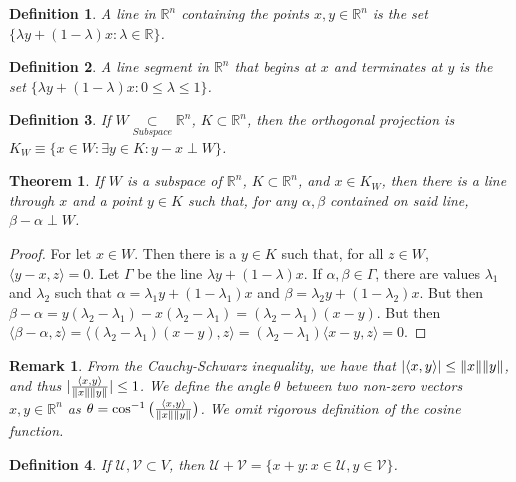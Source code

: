 \documentclass[oneside]{book}
\theoremstyle{mystyle}
\newtheorem{theorem}{Theorem}[section]
\newtheorem{definition}{Definition}[section]
\newtheorem{remark}{Remark}[section]
\DeclarePairedDelimiter\norm{\lVert}{\rVert}
\begin{document}
\begin{definition}
A line in $\mathbb{R}^n$ containing the points $x,y\in \mathbb{R}^n$ is the set $\{\lambda y + (1-\lambda)x: \lambda \in \mathbb{R}\}$.
\end{definition}

\begin{definition}
A line segment in $\mathbb{R}^n$ that begins at $x$ and terminates at $y$ is the set $\{\lambda y + (1-\lambda)x: 0\leq \lambda \leq 1 \}$.
\end{definition}

\begin{definition}
If $W\underset{Subspace}\subset\mathbb{R}^n$, $K \subset \mathbb{R}^n$, then the orthogonal projection is $K_{W}\equiv\{x\in W: \exists y\in K: y-x \perp W\}$.
\end{definition}

\begin{theorem}
If $W$ is a subspace of $\mathbb{R}^n$, $K \subset \mathbb{R}^n$, and $x\in K_{W}$, then there is a line through $x$ and a point $y\in K$ such that, for any $\alpha, \beta$ contained on said line, $\beta-\alpha \perp W$.
\end{theorem}
\begin{proof}
For let $x\in W$. Then there is a $y\in K$ such that, for all $z\in W$, $\langle y-x,z\rangle = 0$. Let $\Gamma$ be the line $\lambda y + (1-\lambda)x$. If $\alpha,\beta \in \Gamma$, there are values $\lambda_1$ and $\lambda_2$ such that $\alpha = \lambda_1 y+ (1-\lambda_1)x$ and $\beta = \lambda_2 y +(1-\lambda_2)x$. But then $\beta-\alpha = y(\lambda_2-\lambda_1)-x(\lambda_2-\lambda_1) = (\lambda_2-\lambda_1)(x-y)$. But then $\langle \beta - \alpha,z\rangle = \langle (\lambda_2-\lambda_1)(x-y),z\rangle = (\lambda_2-\lambda_1)\langle x-y,z \rangle = 0$.
\end{proof}

\begin{remark}
From the Cauchy-Schwarz inequality, we have that $|\langle x,y \rangle| \leq \norm{x}\norm{y}$, and thus $|\frac{\langle x,y \rangle}{\norm{x}\norm{y}}| \leq 1$. We define the $angle\ \theta$ between two non-zero vectors $x,y\in \mathbb{R}^n$ as $\theta=\cos^{-1}\big(\frac{\langle x,y \rangle}{\norm{x}\norm{y}}\big)$. We omit rigorous definition of the cosine function.
\end{remark}

\begin{definition}
If $\mathcal{U},\mathcal{V}\subset V$, then $\mathcal{U}+\mathcal{V} = \{x+y:x\in \mathcal{U},y\in \mathcal{V}\}$.
\end{definition}
\end{document}
